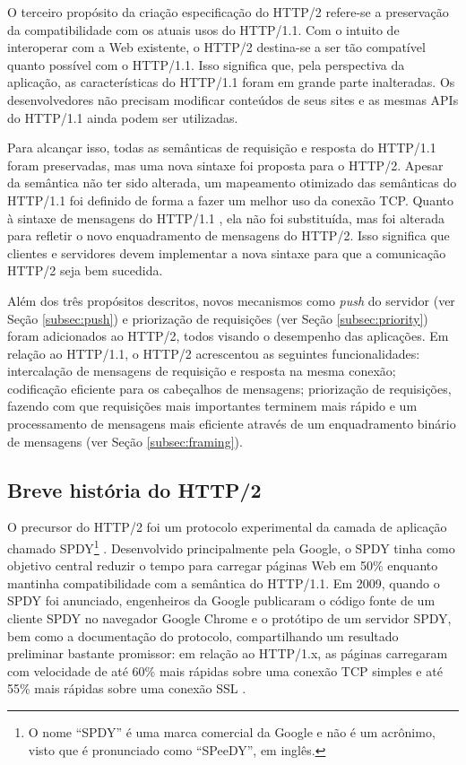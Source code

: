 O terceiro propósito da criação especificação do HTTP/2 refere-se a preservação da compatibilidade com os atuais usos do HTTP/1.1. Com o intuito de interoperar com a Web existente, o HTTP/2 destina-se a ser tão compatível quanto possível com o HTTP/1.1. Isso significa que, pela perspectiva da aplicação, as características do HTTP/1.1 foram em grande parte inalteradas. Os desenvolvedores não precisam modificar conteúdos de seus sites e as mesmas APIs do HTTP/1.1 ainda podem ser utilizadas.

Para alcançar isso, todas as semânticas de requisição e resposta do HTTP/1.1 \cite{FieldingRFC7231} foram preservadas, mas uma nova sintaxe foi proposta para o HTTP/2. Apesar da semântica não ter sido alterada, um mapeamento otimizado das semânticas do HTTP/1.1 foi definido de forma a fazer um melhor uso da conexão TCP. Quanto à sintaxe de mensagens do HTTP/1.1 \cite{FieldingRFC7230}, ela não foi substituída, mas foi alterada para refletir o novo enquadramento de mensagens do HTTP/2. Isso significa que clientes e servidores devem implementar a nova sintaxe para que a comunicação HTTP/2 seja bem sucedida.

Além dos três propósitos descritos, novos mecanismos como {\em push} do servidor (ver Seção \ref{subsec:push}) e priorização de requisições (ver Seção \ref{subsec:priority}) foram adicionados ao HTTP/2, todos visando o desempenho das aplicações. Em relação ao HTTP/1.1, o HTTP/2 acrescentou as seguintes funcionalidades: intercalação de mensagens de requisição e resposta na mesma conexão; codificação eficiente para os cabeçalhos de mensagens; priorização de requisições, fazendo com que requisições mais importantes terminem mais rápido e um processamento de mensagens mais eficiente através de um enquadramento binário de mensagens (ver Seção \ref{subsec:framing}).

\subsection{Breve história do HTTP/2}
\label{subsec:history}

O precursor do HTTP/2 foi um protocolo experimental da camada de aplicação chamado SPDY\footnote{O nome ``SPDY'' é uma marca comercial da Google e não é um acrônimo, visto que é pronunciado como ``SPeeDY'', em inglês.} \cite{Belshe2009SPDY}. Desenvolvido principalmente pela Google, o SPDY tinha como objetivo central reduzir o tempo para carregar páginas Web em 50\% enquanto mantinha compatibilidade com a semântica do HTTP/1.1. 
Em 2009, quando o SPDY foi anunciado, engenheiros da Google publicaram o código fonte de um cliente SPDY no navegador Google Chrome e o protótipo de um servidor SPDY, bem como a documentação do protocolo, compartilhando um resultado preliminar bastante promissor: em relação ao HTTP/1.x, as páginas carregaram com velocidade de até 60\% mais rápidas sobre uma conexão TCP simples e até 55\% mais rápidas sobre uma conexão SSL \cite{Belshe2009A2xFasterWeb}.

